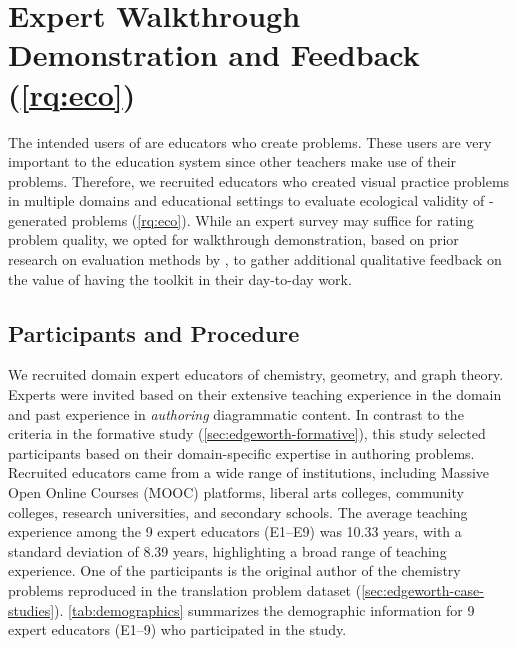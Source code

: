 \section{Expert Walkthrough Demonstration and Feedback (\ref{rq:eco})}
\label{sec:expert-feedback}

The intended users of \Edgeworth are educators who create problems. These users are very important to the education system since other teachers make use of their problems. Therefore, we recruited educators who created visual practice problems in multiple domains and educational settings to evaluate ecological validity of \Edgeworth-generated problems (\ref{rq:eco}). While an expert survey may suffice for rating problem quality, we opted for walkthrough demonstration, based on prior research on evaluation methods by \citet{ledo_evaluation_2018}, to gather additional qualitative feedback on the value of having the toolkit in their day-to-day work.

\subsection{Participants and Procedure}
\label{sec:expert-procedure}

We recruited domain expert educators of chemistry, geometry, and graph theory. Experts were invited based on their extensive teaching experience in the domain and past experience in \emph{authoring} diagrammatic content. In contrast to the criteria in the formative study (\cref{sec:edgeworth-formative}), this study selected participants based on their domain-specific expertise in authoring problems. Recruited educators came from a wide range of institutions, including Massive Open Online Courses (MOOC) platforms, liberal arts colleges, community colleges, research universities, and secondary schools. The average teaching experience among the 9 expert educators (E1–E9) was 10.33 years, with a standard deviation of 8.39 years, highlighting a broad range of teaching experience. One of the participants is the original author of the chemistry problems reproduced in the translation problem dataset (\cref{sec:edgeworth-case-studies}).
\cref{tab:demographics} summarizes the demographic information for 9 expert educators (E1--9) who participated in the study. 

